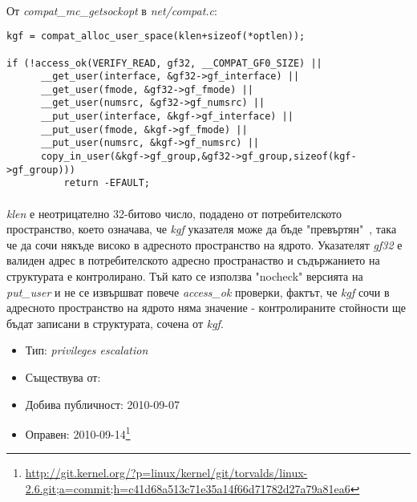 \documentclass[a4paper,12pt,leqno]{article}
\begin{document}
\paragraph{}
От \textit{compat\_mc\_getsockopt} в \textit{net/compat.c}:
\begin{verbatim}
kgf = compat_alloc_user_space(klen+sizeof(*optlen));                            
                                                                                
if (!access_ok(VERIFY_READ, gf32, __COMPAT_GF0_SIZE) ||                         
      __get_user(interface, &gf32->gf_interface) ||                             
      __get_user(fmode, &gf32->gf_fmode) ||                                     
      __get_user(numsrc, &gf32->gf_numsrc) ||                                   
      __put_user(interface, &kgf->gf_interface) ||                              
      __put_user(fmode, &kgf->gf_fmode) ||                                      
      __put_user(numsrc, &kgf->gf_numsrc) ||                                    
      copy_in_user(&kgf->gf_group,&gf32->gf_group,sizeof(kgf->gf_group)))       
          return -EFAULT;
\end{verbatim}
\paragraph{}
\textit{klen} е неотрицателно 32-битово число, подадено от потребителското пространство, което означава, че \textit{kgf} указателя може да бъде "превъртян"\ , така че да сочи някъде високо в адресното пространство на ядрото. Указателят \textit{gf32} е валиден адрес в потребителското адресно пространаство и съдържанието на структурата е контролирано. Тъй като се използва "nocheck" версията на \textit{put\_user} и не се извършват повече \textit{access\_ok} проверки, фактът, че \textit{kgf} сочи в адресното пространство на ядрото няма значение - контролираните стойности ще бъдат записани в структурата, сочена от \textit{kgf}.

\begin{itemize}
    \item Тип: \textit{privileges escalation}
    \item Съществува от:
  	\item Добива публичност: 2010-09-07
    \item Оправен: 2010-09-14\footnote{\url{http://git.kernel.org/?p=linux/kernel/git/torvalds/linux-2.6.git;a=commit;h=c41d68a513c71e35a14f66d71782d27a79a81ea6}}
\end{itemize}
\end{document}
